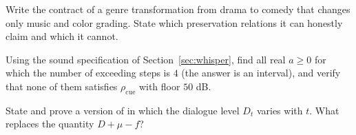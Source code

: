 \begin{exercise}
Write the contract of a genre transformation from drama to comedy that changes only music and color grading. State which preservation relations it can honestly claim and which it cannot.
\end{exercise}

\begin{exercise}
Using the sound specification of Section~\ref{sec:whisper}, find all real $a\ge0$ for which the number of exceeding steps is $4$ (the answer is an interval), and verify that none of them satisfies $\rho_{\mathrm{cue}}$ with floor $50$ dB.
\end{exercise}

\begin{exercise}
State and prove a version of  in which the dialogue level $D_t$ varies with $t$. What replaces the quantity $D+\mu-f$?
\end{exercise}
